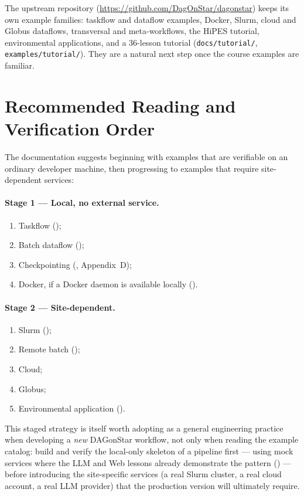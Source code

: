 The upstream repository (\url{https://github.com/DagOnStar/dagonstar}) keeps
its own example families: taskflow and dataflow examples, Docker, Slurm,
cloud and Globus dataflows, transversal and meta-workflows, the HiPES
tutorial, environmental applications, and a 36-lesson tutorial
(\texttt{docs/tutorial/}, \texttt{examples/tutorial/}). They are a natural
next step once the course examples are familiar.

\section{Recommended Reading and Verification Order}

The documentation suggests beginning with examples that are verifiable on an
ordinary developer machine, then progressing to examples that require
site-dependent services:

\paragraph{Stage 1 --- Local, no external service.}
\begin{enumerate}[leftmargin=1.6em]
  \item Taskflow ();
  \item Batch dataflow ();
  \item Checkpointing (, Appendix~D);
  \item Docker, if a Docker daemon is available locally
    ().
\end{enumerate}

\paragraph{Stage 2 --- Site-dependent.}
\begin{enumerate}[leftmargin=1.6em]
  \item Slurm ();
  \item Remote batch ();
  \item Cloud;
  \item Globus;
  \item Environmental application ().
\end{enumerate}

\begin{practicebox}
This staged strategy is itself worth adopting as a general engineering
practice when developing a \emph{new} DAGonStar workflow, not only when
reading the example catalog: build and verify the local-only skeleton of a
pipeline first --- using mock services where the LLM and Web lessons already
demonstrate the pattern () --- before
introducing the site-specific services (a real Slurm cluster, a real cloud
account, a real LLM provider) that the production version will ultimately
require.
\end{practicebox}


